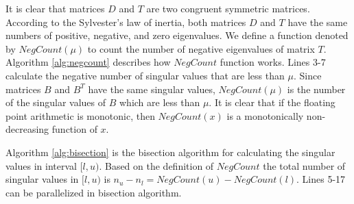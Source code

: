 It is clear that matrices $D$ and $T$ are two congruent symmetric matrices.
According to the Sylvester's law of inertia, both matrices $D$ and $T$ have the same numbers of positive, negative, and zero eigenvalues.
We define a function denoted by $NegCount(\mu)$ to count the number of negative eigenvalues of matrix $T$.
Algorithm \ref{alg:negcount} describes how $NegCount$ function works.
Lines 3-7 calculate the negative number of singular values that are less than $\mu$.
Since matrices $B$ and $B^T$ have the same singular values,
$NegCount(\mu)$ is the number of the singular values of $B$ which are less than $\mu$.
It is clear that if the floating point arithmetic is monotonic, then $NegCount(x)$ is a monotonically non-decreasing function of $x$\cite{95ETNAbisecion}.


Algorithm \ref{alg:bisection} is the bisection algorithm for calculating the singular values in interval $[l,u)$. Based on the definition of $NegCount$ the total number of singular values in $[l,u)$ is $n_u - n_l = NegCount(u) - NegCount(l)$.
Lines 5-17 can be parallelized in bisection algorithm.



